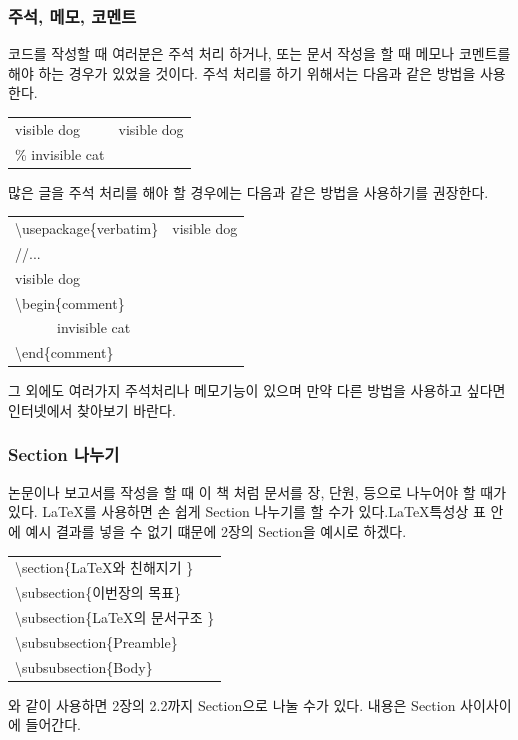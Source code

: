 \documentclass[12pt]{article}
\begin{document}
	\subsubsection{주석, 메모, 코멘트}
	코드를 작성할 때 여러분은 주석 처리 하거나, 또는 문서 작성을 할 때 메모나 코멘트를 해야 하는 경우가 있었을 것이다.\newline
	주석 처리를 하기 위해서는 다음과 같은 방법을 사용한다.\newline
	
	\begin{tabularx}{\textwidth \onehalfspacing}{|X|X|}
		\hline
		visible dog & visible dog\\
		\% invisible cat & \\
		\hline
	\end{tabularx}
	\newline
	\newline
	많은 글을 주석 처리를 해야 할 경우에는 다음과 같은 방법을 사용하기를 권장한다.\newline
	
	\begin{tabularx}{\textwidth \onehalfspacing}{|X|X|}
		\hline
		\textbackslash usepackage\{verbatim\} & visible dog\\
		//...& \\
		visible dog & \\
		\textbackslash begin\{comment\} & \\
		\ \ \ \ \ \ invisible cat & \\
		\textbackslash end\{comment\} & \\
		\hline
	\end{tabularx}
	\newline
	\newline
	그 외에도 여러가지 주석처리나 메모기능이 있으며 만약 다른 방법을 사용하고 싶다면 인터넷에서 찾아보기 바란다.
	\subsubsection{Section 나누기}
	논문이나 보고서를 작성을 할 때 이 책 처럼 문서를 장, 단원, 등으로 나누어야 할 때가 있다. \LaTeX 를 사용하면 손 쉽게 Section 나누기를 할 수가 있다.\LaTeX 특성상 표 안에 예시 결과를 넣을 수 없기 떄문에 2장의 Section을 예시로 하겠다.\newline
	
	\begin{tabularx}{\textwidth \onehalfspacing}{|X|}
		\hline
		\textbackslash section\{\LaTeX 와 친해지기 \}\\
		\textbackslash subsection\{이번장의 목표\}\\
		\textbackslash subsection\{\LaTeX 의 문서구조 \}\\
		\textbackslash subsubsection\{Preamble\}\\
		\textbackslash subsubsection\{Body\}\\
		\hline
	\end{tabularx}
	\newline
	\newline
	와 같이 사용하면 2장의 2.2까지 Section으로 나눌 수가 있다. 내용은 Section 사이사이에 들어간다.
	\clearpage
	
\end{document}
